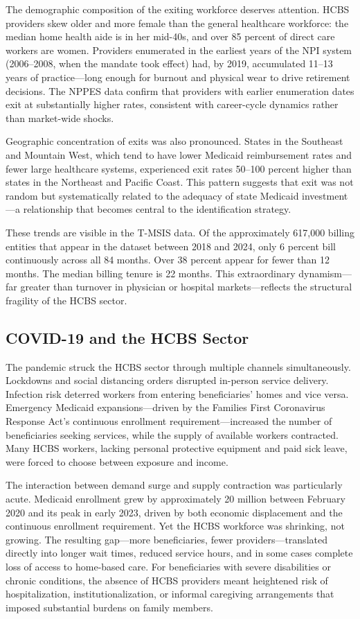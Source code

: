 \documentclass[12pt]{article}
\begin{document}
The demographic composition of the exiting workforce deserves attention. HCBS providers skew older and more female than the general healthcare workforce: the median home health aide is in her mid-40s, and over 85 percent of direct care workers are women. Providers enumerated in the earliest years of the NPI system (2006--2008, when the mandate took effect) had, by 2019, accumulated 11--13 years of practice---long enough for burnout and physical wear to drive retirement decisions. The NPPES data confirm that providers with earlier enumeration dates exit at substantially higher rates, consistent with career-cycle dynamics rather than market-wide shocks.

Geographic concentration of exits was also pronounced. States in the Southeast and Mountain West, which tend to have lower Medicaid reimbursement rates and fewer large healthcare systems, experienced exit rates 50--100 percent higher than states in the Northeast and Pacific Coast. This pattern suggests that exit was not random but systematically related to the adequacy of state Medicaid investment---a relationship that becomes central to the identification strategy.

These trends are visible in the T-MSIS data. Of the approximately 617,000 billing entities that appear in the dataset between 2018 and 2024, only 6 percent bill continuously across all 84 months. Over 38 percent appear for fewer than 12 months. The median billing tenure is 22 months. This extraordinary dynamism---far greater than turnover in physician or hospital markets---reflects the structural fragility of the HCBS sector.

\subsection{COVID-19 and the HCBS Sector}

The pandemic struck the HCBS sector through multiple channels simultaneously. Lockdowns and social distancing orders disrupted in-person service delivery. Infection risk deterred workers from entering beneficiaries' homes and vice versa. Emergency Medicaid expansions---driven by the Families First Coronavirus Response Act's continuous enrollment requirement---increased the number of beneficiaries seeking services, while the supply of available workers contracted. Many HCBS workers, lacking personal protective equipment and paid sick leave, were forced to choose between exposure and income.

The interaction between demand surge and supply contraction was particularly acute. Medicaid enrollment grew by approximately 20 million between February 2020 and its peak in early 2023, driven by both economic displacement and the continuous enrollment requirement. Yet the HCBS workforce was shrinking, not growing. The resulting gap---more beneficiaries, fewer providers---translated directly into longer wait times, reduced service hours, and in some cases complete loss of access to home-based care. For beneficiaries with severe disabilities or chronic conditions, the absence of HCBS providers meant heightened risk of hospitalization, institutionalization, or informal caregiving arrangements that imposed substantial burdens on family members.
\end{document}
